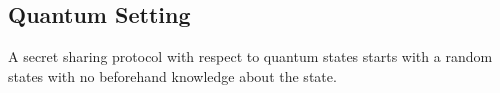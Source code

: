 \documentclass[12pt]{article}
\begin{document}
\subsection{Quantum Setting}
    A secret sharing protocol with respect to quantum states starts with a random states with no beforehand knowledge about the state. 


	





\end{document}

